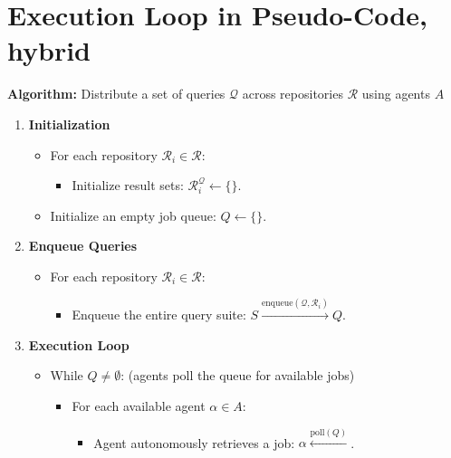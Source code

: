 \documentclass[11pt]{article}
\begin{document}
\FloatBarrier

\section{Execution Loop in Pseudo-Code, hybrid}
\label{sec:orgb767ab2}
{\textbf{Algorithm:} Distribute a set of queries \(\mathcal{Q}\) across repositories \(\mathcal{R}\) using agents \(A\)}

\begin{enumerate}
\item \textbf{\textbf{Initialization}}
\begin{itemize}
\item For each repository \(\mathcal{R}_i \in \mathcal{R}\):
\begin{itemize}
\item Initialize result sets: \(\mathcal{R}_i^{\mathcal{Q}} \gets \{\}\).
\end{itemize}
\item Initialize an empty job queue: \(Q \gets \{\}\).
\end{itemize}

\item \textbf{\textbf{Enqueue Queries}}
\begin{itemize}
\item For each repository \(\mathcal{R}_i \in \mathcal{R}\):
\begin{itemize}
\item Enqueue the entire query suite: \(S \xrightarrow{\text{enqueue}(\mathcal{Q}, \mathcal{R}_i)} Q\).
\end{itemize}
\end{itemize}

\item \textbf{\textbf{Execution Loop}}
\begin{itemize}
\item While \(Q \neq \emptyset\): (agents poll the queue for available jobs)
\begin{itemize}
\item For each available agent \(\alpha \in A\):
\begin{itemize}
\item Agent autonomously retrieves a job: \(\alpha \xleftarrow{\text{poll}(Q)}\).


\end{itemize}
\end{itemize}
\end{itemize}
\end{enumerate}
\end{document}
